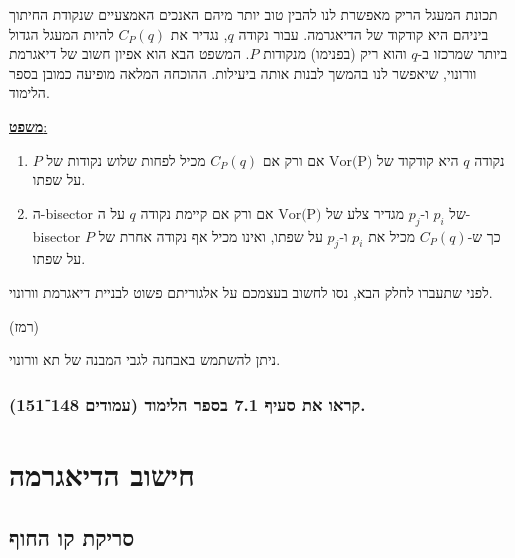\documentclass[
]{book}
\providecommand{\tightlist}{%
  \setlength{\itemsep}{0pt}\setlength{\parskip}{0pt}}
\begin{document}
תכונת המעגל הריק מאפשרת לנו להבין טוב יותר מיהם האנכים האמצעיים שנקודת החיתוך ביניהם היא קודקוד של הדיאגרמה. עבור נקודה \(q\), נגדיר את \(C_P(q)\) להיות המעגל הגדול ביותר שמרכזו ב-\(q\) והוא ריק (בפנימו) מנקודות \(P\). המשפט הבא הוא אפיון חשוב של דיאגרמת וורונוי, שיאפשר לנו בהמשך לבנות אותה ביעילות. ההוכחה המלאה מופיעה כמובן בספר הלימוד.

\ul{\textbf{משפט}:}

\begin{enumerate}
\def\labelenumi{\arabic{enumi}.}
\tightlist
\item
  נקודה \(q\) היא קודקוד של \(\text{Vor(P)}\) אם ורק אם \(C_P(q)\) מכיל לפחות שלוש נקודות של \(P\) על שפתו.
\item
  ה-bisector של \(p_i\) ו-\(p_j\) מגדיר צלע של \(\text{Vor(P)}\) אם ורק אם קיימת נקודה \(q\) על ה-bisector כך ש-\(C_P(q)\) מכיל את \(p_i\) ו-\(p_j\) על שפתו, ואינו מכיל אף נקודה אחרת של \(P\) על שפתו.
\end{enumerate}

לפני שתעברו לחלק הבא, נסו לחשוב בעצמכם על אלגוריתם פשוט לבניית דיאגרמת וורונוי.

(רמז)

ניתן להשתמש באבחנה לגבי המבנה של תא וורונוי.

\hypertarget{ux5e7ux5e8ux5d0ux5d5-ux5d0ux5ea-ux5e1ux5e2ux5d9ux5e3-7.1-ux5d1ux5e1ux5e4ux5e8-ux5d4ux5dcux5d9ux5deux5d5ux5d3-ux5e2ux5deux5d5ux5d3ux5d9ux5dd-148151.}{%
\subsubsection*{קראו את סעיף 7.1 בספר הלימוד (עמודים 148־151).}\label{ux5e7ux5e8ux5d0ux5d5-ux5d0ux5ea-ux5e1ux5e2ux5d9ux5e3-7.1-ux5d1ux5e1ux5e4ux5e8-ux5d4ux5dcux5d9ux5deux5d5ux5d3-ux5e2ux5deux5d5ux5d3ux5d9ux5dd-148151.}}

\hypertarget{ux5d7ux5d9ux5e9ux5d5ux5d1-ux5d4ux5d3ux5d9ux5d0ux5d2ux5e8ux5deux5d4}{%
\section{חישוב הדיאגרמה}\label{ux5d7ux5d9ux5e9ux5d5ux5d1-ux5d4ux5d3ux5d9ux5d0ux5d2ux5e8ux5deux5d4}}

\hypertarget{ux5e1ux5e8ux5d9ux5e7ux5ea-ux5e7ux5d5-ux5d4ux5d7ux5d5ux5e3}{%
\subsection{סריקת קו החוף}\label{ux5e1ux5e8ux5d9ux5e7ux5ea-ux5e7ux5d5-ux5d4ux5d7ux5d5ux5e3}}
\end{document}
